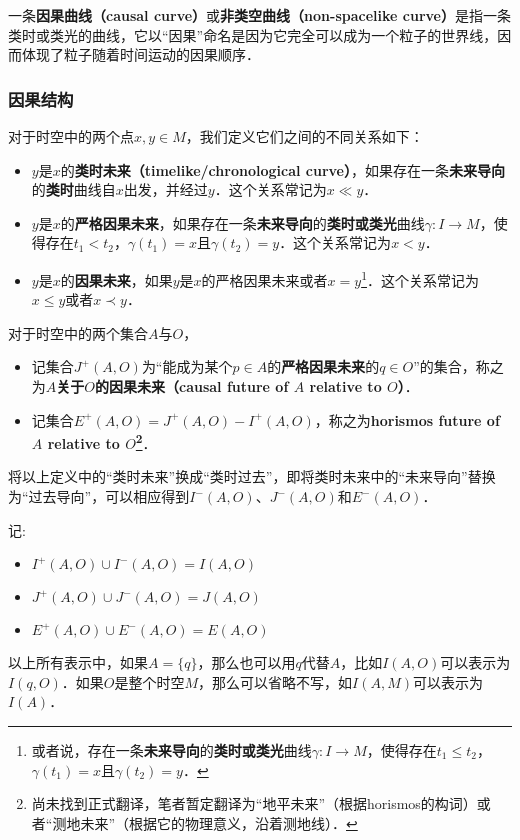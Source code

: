 一条\textbf{因果曲线（causal curve）}或\textbf{非类空曲线（non-spacelike curve）}是指一条类时或类光的曲线，它以“因果”命名是因为它完全可以成为一个粒子的世界线，因而体现了粒子随着时间运动的因果顺序．


\subsubsection{因果结构}

对于时空中的两个点$x, y\in M$，我们定义它们之间的不同关系如下：

\begin{itemize}
\item $y$是$x$的\textbf{类时未来（timelike/chronological curve）}，如果存在一条\textbf{未来导向}的\textbf{类时}曲线自$x$出发，并经过$y$．这个关系常记为$x\ll y$．
\item $y$是$x$的\textbf{严格因果未来}，如果存在一条\textbf{未来导向}的\textbf{类时或类光}曲线$\gamma:I\rightarrow M$，使得存在$t_1<t_2$，$\gamma(t_1)=x$且$\gamma(t_2)=y$．这个关系常记为$x< y$．
\item $y$是$x$的\textbf{因果未来}，如果$y$是$x$的严格因果未来或者$x=y$\footnote{或者说，存在一条\textbf{未来导向}的\textbf{类时或类光}曲线$\gamma:I\rightarrow M$，使得存在$t_1\leq t_2$，$\gamma(t_1)=x$且$\gamma(t_2)=y$．}．这个关系常记为$x\leq y$或者$x\prec y$．
\end{itemize}

对于时空中的两个集合$A$与$O$，


\begin{itemize}
$I^+(A, O)$为“能成为某个$p\in A$的\textbf{类时未来}的$q\in O$”的集合，称之为\textbf{$A$关于$O$的类时未来（choronological future of $A$ relative to $O$）}．
\item 记集合$J^+(A, O)$为“能成为某个$p\in A$的\textbf{严格因果未来}的$q\in O$”的集合，称之为\textbf{$A$关于$O$的因果未来（causal future of $A$ relative to $O$）}．
\item 记集合$E^+(A, O)=J^+(A, O)-I^+(A, O)$，称之为\textbf{horismos future of $A$ relative to $O$\footnote{尚未找到正式翻译，笔者暂定翻译为“地平未来”（根据horismos的构词）或者“测地未来”（根据它的物理意义，沿着测地线）．}}．
\end{itemize}

将以上定义中的“类时未来”换成“类时过去”，即将类时未来中的“未来导向”替换为“过去导向”，可以相应得到$I^-(A, O)$、$J^-(A, O)$和$E^-(A, O)$．

记:
\begin{itemize}
\item $I^+(A, O)\cup I^-(A, O)=I(A,O)$
\item $J^+(A, O)\cup J^-(A, O)=J(A,O)$
\item $E^+(A, O)\cup E^-(A, O)=E(A,O)$
\end{itemize}

以上所有表示中，如果$A=\{q\}$，那么也可以用$q$代替$A$，比如$I(A, O)$可以表示为$I(q, O)$．如果$O$是整个时空$M$，那么可以省略不写，如$I(A, M)$可以表示为$I(A)$．








